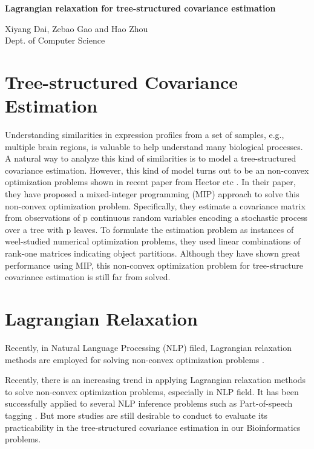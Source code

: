 \documentclass[11pt, reqno]{amsart}
\begin{document}
\begin{center}
\textbf{Lagrangian relaxation for tree-structured covariance estimation}
\newline
\end{center}
\begin{flushright}
Xiyang Dai, Zebao Gao and Hao Zhou\\
Dept. of Computer Science
\end{flushright}
\fi

\section{Tree-structured Covariance Estimation}
Understanding similarities in expression profiles from a set of samples, e.g., multiple brain regions, is valuable to help understand many biological processes. A natural way to analyze this kind of similarities is to model a tree-structured covariance estimation. However, this kind of model turns out to be an non-convex optimization problems shown in recent paper from Hector etc \cite{Hector09}. In their paper, they have proposed a mixed-integer programming (MIP) approach to solve this non-convex optimization problem. 
Specifically, they estimate a covariance matrix from observations of p continuous random variables encoding a stochastic process over a tree with p leaves. To formulate the estimation problem as instances of weel-studied numerical optimization problems, they used linear combinations of rank-one matrices indicating object partitions. Although they have shown great performance using MIP, this non-convex optimization problem for tree-structure covariance estimation is still far from solved.

\section{Lagrangian Relaxation}
Recently, in Natural Language Processing (NLP) filed, Lagrangian relaxation methods are employed for solving non-convex optimization problems .

Recently, there is an increasing trend in applying Lagrangian relaxation methods to solve non-convex optimization problems, especially in NLP field. It has been successfully applied to several NLP inference problems such as Part-of-speech tagging \cite{Lagrangian}. But more studies are still desirable to conduct to evaluate its practicability in the tree-structured covariance estimation in our Bioinformatics problems.
\end{document}
